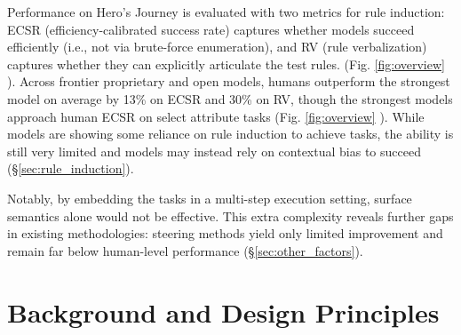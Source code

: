 \documentclass[11pt]{article}
\newcommand{\AS}{{\sc Hero's Journey}\xspace}
\DeclareRobustCommand{\cnum}[1]{%
  \tikz[baseline=(c.base)]{%
    \node[circle,fill=black,inner sep=1pt,
          font=\scriptsize\bfseries\color{white}] (c) {#1};%
  }%
}
\begin{document}
Performance on \AS is evaluated with two metrics for rule induction: ECSR (efficiency-calibrated success rate) captures whether models succeed efficiently (i.e., not via brute-force enumeration), and RV (rule verbalization) captures whether they can explicitly articulate the test rules. (Fig. \ref{fig:overview} \cnum{6}). 
Across frontier proprietary and open models, humans outperform the strongest model on average by 13\% on ECSR and 30\% on RV, though the strongest models approach human ECSR on select attribute tasks (Fig. \ref{fig:overview} \cnum{7}).
While models are showing some reliance on rule induction to achieve tasks, the ability is still very limited and models may instead rely on contextual bias to succeed (\S\ref{sec:rule_induction}).

Notably, by embedding the tasks in a multi-step execution setting, surface semantics alone would not be effective. This extra complexity reveals further gaps in existing methodologies: steering methods yield only limited improvement and remain far below human-level performance   
(\S\ref{sec:other_factors}).




\section{Background and Design Principles}
\label{background}
\end{document}
